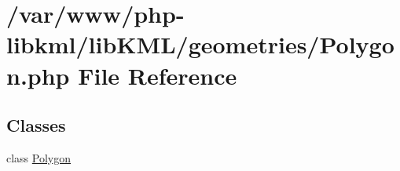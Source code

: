 \hypertarget{Polygon_8php}{
\section{/var/www/php-\/libkml/libKML/geometries/Polygon.php File Reference}
\label{df/d1a/Polygon_8php}
}
\subsection*{Classes}
\begin{DoxyCompactItemize}
\item 
class \hyperlink{classPolygon}{Polygon}
\end{DoxyCompactItemize}
